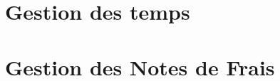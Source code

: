 \documentclass[a4paper,12pt]{report}
\begin{document}
\chapter{Gestion des temps}

\chapter{Gestion des Notes de Frais}


	
\end{document}
